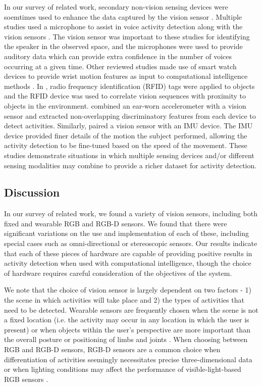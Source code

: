 \documentclass[12pt]{report}
\begin{document}
In our survey of related work, secondary non-vision sensing devices were soemtimes used to enhance the data captured by the vision sensor \cite{Yoshida2010, Radhakrishnan2016, Savran2018, Wu2007, Akbari2017, McIlwraith2008, Zhao2017, Lim2009, Li2016}. Multiple studies used a microphone to assist in voice activity detection along with the vision sensors \cite{Yoshida2010,Savran2018,Lim2009}. The vision sensor was important to these studies for identifying the speaker in the observed space, and the microphones were used to provide auditory data which can provide extra confidence in the number of voices occurring at a given time. Other reviewed studies made use of smart watch devices to provide  wrist motion features as input to computational intelligence methods \cite{Radhakrishnan2016, Zhao2017}. In \cite{Wu2007}, radio frequency identification (RFID) tags were applied to objects and the RFID device was used to correlate vision sequences with proximity to objects in the environment. \cite{McIlwraith2008} combined an ear-worn accelerometer with a vision sensor and extracted non-overlapping discriminatory features from each device to detect activities. Similarly, \cite{Akbari2017} paired a vision sensor with an IMU device. The IMU device provided finer details of the motion the subject performed, allowing the activity detection to be fine-tuned based on the speed of the movement. These studies demonstrate situations in which multiple sensing devices and/or different sensing modalities may combine to provide a richer dataset for activity detection.

\subsection{Discussion}

In our survey of related work, we found a variety of vision sensors, including both fixed and wearable RGB and RGB-D sensors. We found that there were significant variations on the use and implementation of each of these, including special cases such as omni-directional or stereoscopic sensors. Our results indicate that each of these pieces of hardware are capable of providing positive results in activity detection when used with computational intelligence, though the choice of hardware requires careful consideration of the objectives of the system. 

We note that the choice of vision sensor is largely dependent on two factors - 1) the scene in which activities will take place and 2) the types of activities that need to be detected. Wearable sensors are frequently chosen when the scene is not a fixed location (i.e. the activity may occur in any location in which the user is present) \cite{Baraldi2015} or when objects within the user’s perspective are more important than the overall posture or positioning of limbs and joints \cite{Baraldi2015, Li2016, Radhakrishnan2016}. When choosing between RGB and RGB-D sensors, RGB-D sensors are a common choice when differentiation of activities seemingly necessitates precise three-dimensional data \cite{Ong2013, Figueroa-Angulo2013} or when lighting conditions may affect the performance of visible-light-based RGB sensors \cite{Banerjee2014}.
\end{document}
